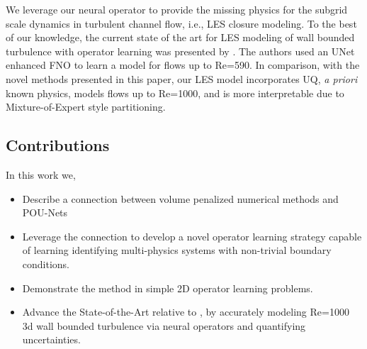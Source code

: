 We leverage our neural operator to provide the missing physics for the subgrid scale dynamics in turbulent channel flow, i.e., LES closure modeling. To the best of our knowledge, the current state of the art for LES modeling of wall bounded turbulence with operator learning was presented by \citep{wang2024prediction}. The authors used an UNet enhanced FNO to learn a model for flows up to Re=590. In comparison, with the novel methods presented in this paper, our LES model incorporates UQ, \textit{a priori} known physics, models flows up to Re=1000, and is more interpretable due to Mixture-of-Expert style partitioning.

\subsection{Contributions}

In this work we,

\begin{itemize}
    \item Describe a connection between volume penalized numerical methods and POU-Nets
    \item Leverage the connection to develop a novel operator learning strategy capable of learning identifying multi-physics systems with non-trivial boundary conditions.
    \item Demonstrate the method in simple 2D operator learning problems.
    \item Advance the State-of-the-Art relative to \cite{wang2024prediction}, by accurately modeling Re=1000 3d wall bounded turbulence via neural operators and quantifying uncertainties.
\end{itemize}
